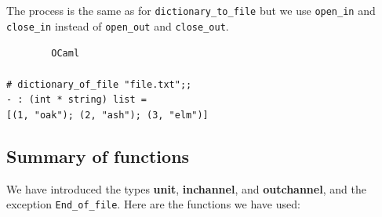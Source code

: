 \documentclass[]{book}
\newcommand{\smspace}{\vspace{4mm}}
\begin{document}
{\begin{sloppypar}
\noindent The process is the same as for \texttt{dictionary\_to\_file} but we use \texttt{open\_in} and \texttt{close\_in} instead of \texttt{open\_out} and \texttt{close\_out}.
\end{sloppypar}}

\smspace
\noindent\verb!        OCaml!\\
\noindent\\
\noindent\verb!# dictionary_of_file "file.txt";;!\\
\noindent\verb!- : (int * string) list =!\\
\noindent\verb![(1, "oak"); (2, "ash"); (3, "elm")]!

\subsection*{Summary of functions}

We have introduced the types \textrm{\textbf{unit}}, \textrm{\textbf{in\raisebox{2pt}{\_}channel}}, and \textrm{\textbf{out\raisebox{2pt}{\_}channel}}, and the exception \texttt{End\_of\_file}. Here are the functions we have used:
\end{document}
